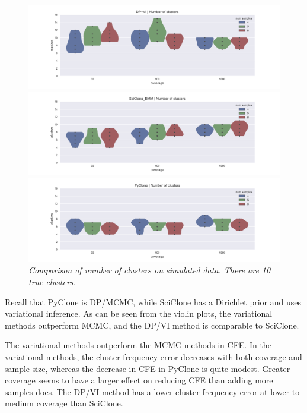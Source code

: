 \documentclass[11pt]{article}
\begin{document}
\newpage
\begin{figure}[H]
\vspace{-0.25in}
\centerline{\includegraphics[scale=0.75]{DPVI_num_clusters.png}}
\centerline{\includegraphics[scale=0.75]{SciClone_num_clusters.png}}
\centerline{\includegraphics[scale=0.75]{PyClone_num_clusters.png}}
\caption{\emph{Comparison of number of clusters on simulated data. There are 10 true clusters.}}
\label{fig:SimNClusters}
\end{figure}

Recall that PyClone is DP/MCMC, while SciClone has a Dirichlet prior and uses variational inference. As can be seen from the violin plots, the variational methods outperform MCMC, and the DP/VI method is comparable to SciClone.

The variational methods outperform the MCMC methods in CFE. In the variational methods, the cluster frequency error decreases with both coverage and sample size, whereas the decrease in CFE in PyClone is quite modest. Greater coverage seems to have a larger effect on reducing CFE than adding more samples does. The DP/VI method has a lower cluster frequency error at lower to medium coverage than SciClone.
\end{document}
